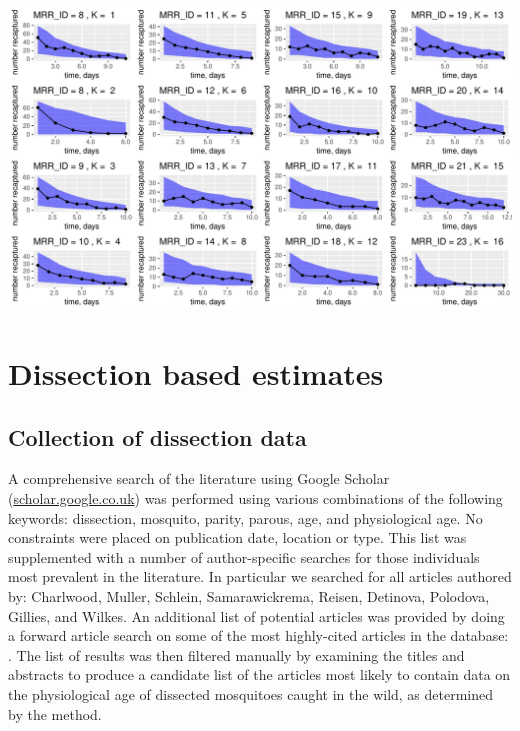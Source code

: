\documentclass[12pt]{article}
\begin{document}
{{%
	\includegraphics[page=3,scale=.6]{./Figure_files/mrr_ppcs_all}
	\label{fig:mrr_ppc3}
	\par
}




\section{Dissection based estimates}

\subsection{Collection of dissection data}\label{sec:dissection_dissectionData}
A comprehensive search of the literature using Google Scholar (\url{scholar.google.co.uk}) was performed using various combinations of the following keywords: dissection, mosquito, parity, parous, age, and physiological age. No constraints were placed on publication date, location or type. This list was supplemented with a number of author-specific searches for those individuals most prevalent in the literature. In particular we searched for all articles authored by: Charlwood, Muller, Schlein, Samarawickrema, Reisen, Detinova, Polodova, Gillies, and Wilkes. An additional list of potential articles was provided by doing a forward article search on some of the most highly-cited articles in the database: \cite{polovodova1949determination,detinova1962age,gillies1965study,clements1981analysis}. The list of results was then filtered manually by examining the titles and abstracts to produce a candidate list of the articles most likely to contain data on the physiological age of dissected mosquitoes caught in the wild, as determined by the \cite{polovodova1949determination} method.

}
\end{document}
